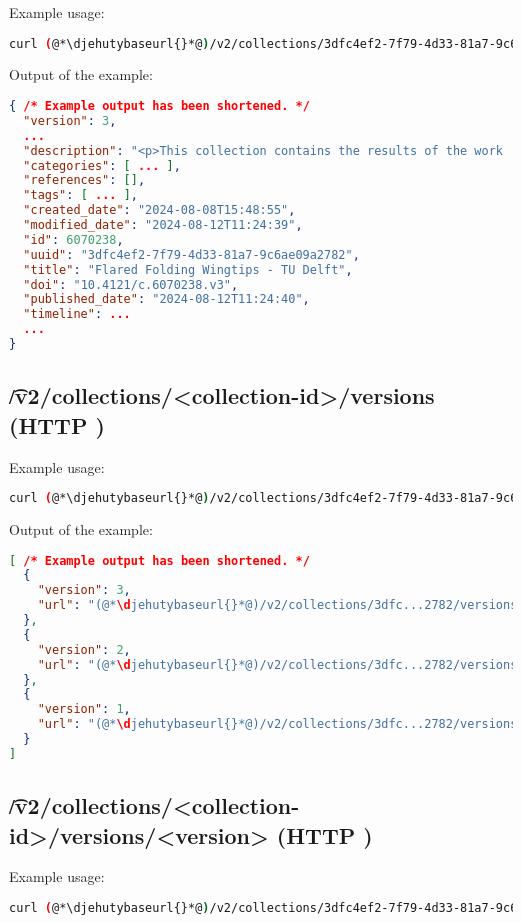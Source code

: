  Example usage:
\begin{lstlisting}[language=bash]
curl (@*\djehutybaseurl{}*@)/v2/collections/3dfc4ef2-7f79-4d33-81a7-9c6ae09a2782 | jq
\end{lstlisting}

  Output of the example:
\begin{lstlisting}[language=JSON]
{ /* Example output has been shortened. */
  "version": 3,
  ...
  "description": "<p>This collection contains the results of the work ...",
  "categories": [ ... ],
  "references": [],
  "tags": [ ... ],
  "created_date": "2024-08-08T15:48:55",
  "modified_date": "2024-08-12T11:24:39",
  "id": 6070238,
  "uuid": "3dfc4ef2-7f79-4d33-81a7-9c6ae09a2782",
  "title": "Flared Folding Wingtips - TU Delft",
  "doi": "10.4121/c.6070238.v3",
  "published_date": "2024-08-12T11:24:40",
  "timeline": ...
  ...
}
\end{lstlisting}

\subsection{\t{/v2/collections/<collection-id>/versions} (HTTP )}

  Example usage:
\begin{lstlisting}[language=bash]
curl (@*\djehutybaseurl{}*@)/v2/collections/3dfc4ef2-7f79-4d33-81a7-9c6ae09a2782/versions | jq
\end{lstlisting}

  Output of the example:
\begin{lstlisting}[language=JSON]
[ /* Example output has been shortened. */
  {
    "version": 3,
    "url": "(@*\djehutybaseurl{}*@)/v2/collections/3dfc...2782/versions/3"
  },
  {
    "version": 2,
    "url": "(@*\djehutybaseurl{}*@)/v2/collections/3dfc...2782/versions/2"
  },
  {
    "version": 1,
    "url": "(@*\djehutybaseurl{}*@)/v2/collections/3dfc...2782/versions/1"
  }
]
\end{lstlisting}

\subsection{\t{/v2/collections/<collection-id>/versions/<version>} (HTTP )}

  Example usage:
\begin{lstlisting}[language=bash]
curl (@*\djehutybaseurl{}*@)/v2/collections/3dfc4ef2-7f79-4d33-81a7-9c6ae09a2782/versions/2 | jq
\end{lstlisting}

